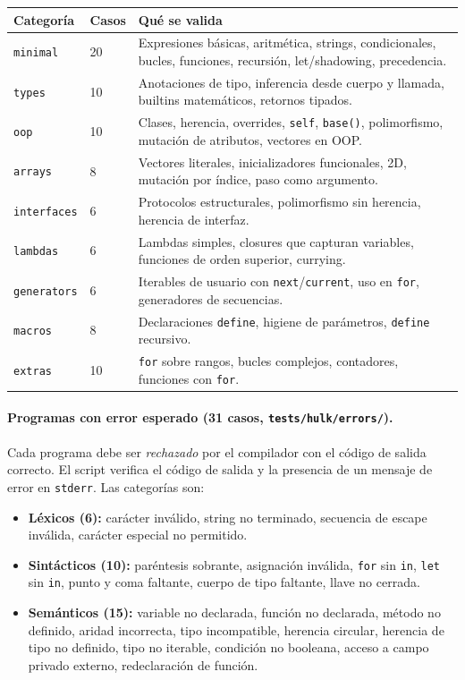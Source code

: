 \documentclass[12pt,letterpaper]{article}
\newcommand{\src}[1]{\texttt{#1}}
\begin{document}
\begin{longtable}{p{2.8cm}p{1.5cm}p{9.5cm}}
\toprule
\textbf{Categoría} & \textbf{Casos} & \textbf{Qué se valida} \\
\midrule
\src{minimal} & 20 & Expresiones básicas, aritmética, strings, condicionales, bucles, funciones, recursión, let/shadowing, precedencia. \\
\src{types} & 10 & Anotaciones de tipo, inferencia desde cuerpo y llamada, builtins matemáticos, retornos tipados. \\
\src{oop} & 10 & Clases, herencia, overrides, \src{self}, \src{base()}, polimorfismo, mutación de atributos, vectores en OOP. \\
\src{arrays} & 8 & Vectores literales, inicializadores funcionales, 2D, mutación por índice, paso como argumento. \\
\src{interfaces} & 6 & Protocolos estructurales, polimorfismo sin herencia, herencia de interfaz. \\
\src{lambdas} & 6 & Lambdas simples, closures que capturan variables, funciones de orden superior, currying. \\
\src{generators} & 6 & Iterables de usuario con \src{next}/\src{current}, uso en \src{for}, generadores de secuencias. \\
\src{macros} & 8 & Declaraciones \src{define}, higiene de parámetros, \src{define} recursivo. \\
\src{extras} & 10 & \src{for} sobre rangos, bucles complejos, contadores, funciones con \src{for}. \\
\bottomrule
\end{longtable}

\paragraph{Programas con error esperado (31 casos, \src{tests/hulk/errors/}).}
Cada programa debe ser \emph{rechazado} por el compilador con el código de salida correcto. El script verifica el código de salida y la presencia de un mensaje de error en \src{stderr}. Las categorías son:

\begin{itemize}
    \item \textbf{Léxicos (6):} carácter inválido, string no terminado, secuencia de escape inválida, carácter especial no permitido.
    \item \textbf{Sintácticos (10):} paréntesis sobrante, asignación inválida, \src{for} sin \src{in}, \src{let} sin \src{in}, punto y coma faltante, cuerpo de tipo faltante, llave no cerrada.
    \item \textbf{Semánticos (15):} variable no declarada, función no declarada, método no definido, aridad incorrecta, tipo incompatible, herencia circular, herencia de tipo no definido, tipo no iterable, condición no booleana, acceso a campo privado externo, redeclaración de función.
\end{itemize}
\end{document}
